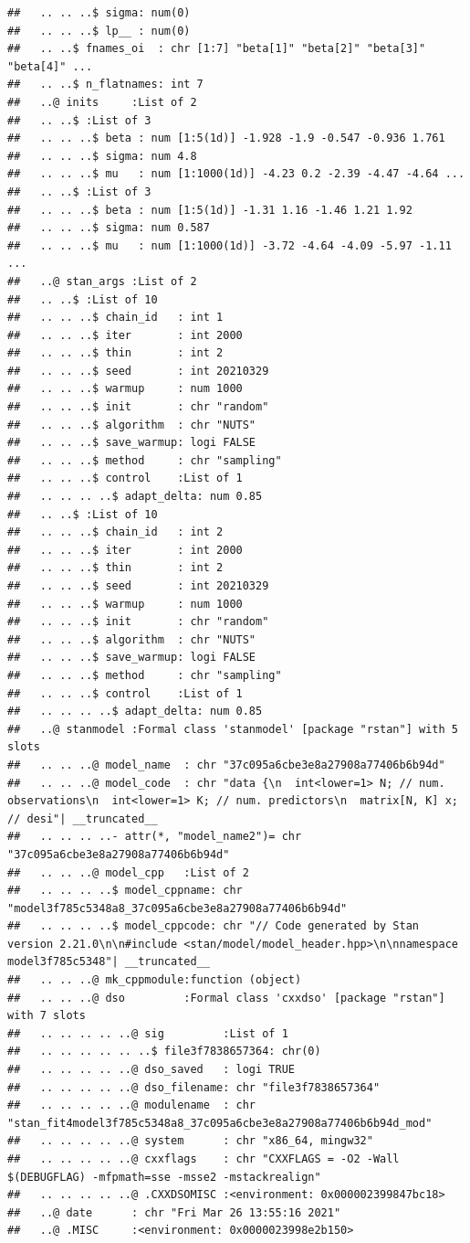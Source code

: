 \documentclass[
  11pt,
]{article}
\begin{document}
\begin{verbatim}
##   .. .. ..$ sigma: num(0) 
##   .. .. ..$ lp__ : num(0) 
##   .. ..$ fnames_oi  : chr [1:7] "beta[1]" "beta[2]" "beta[3]" "beta[4]" ...
##   .. ..$ n_flatnames: int 7
##   ..@ inits     :List of 2
##   .. ..$ :List of 3
##   .. .. ..$ beta : num [1:5(1d)] -1.928 -1.9 -0.547 -0.936 1.761
##   .. .. ..$ sigma: num 4.8
##   .. .. ..$ mu   : num [1:1000(1d)] -4.23 0.2 -2.39 -4.47 -4.64 ...
##   .. ..$ :List of 3
##   .. .. ..$ beta : num [1:5(1d)] -1.31 1.16 -1.46 1.21 1.92
##   .. .. ..$ sigma: num 0.587
##   .. .. ..$ mu   : num [1:1000(1d)] -3.72 -4.64 -4.09 -5.97 -1.11 ...
##   ..@ stan_args :List of 2
##   .. ..$ :List of 10
##   .. .. ..$ chain_id   : int 1
##   .. .. ..$ iter       : int 2000
##   .. .. ..$ thin       : int 2
##   .. .. ..$ seed       : int 20210329
##   .. .. ..$ warmup     : num 1000
##   .. .. ..$ init       : chr "random"
##   .. .. ..$ algorithm  : chr "NUTS"
##   .. .. ..$ save_warmup: logi FALSE
##   .. .. ..$ method     : chr "sampling"
##   .. .. ..$ control    :List of 1
##   .. .. .. ..$ adapt_delta: num 0.85
##   .. ..$ :List of 10
##   .. .. ..$ chain_id   : int 2
##   .. .. ..$ iter       : int 2000
##   .. .. ..$ thin       : int 2
##   .. .. ..$ seed       : int 20210329
##   .. .. ..$ warmup     : num 1000
##   .. .. ..$ init       : chr "random"
##   .. .. ..$ algorithm  : chr "NUTS"
##   .. .. ..$ save_warmup: logi FALSE
##   .. .. ..$ method     : chr "sampling"
##   .. .. ..$ control    :List of 1
##   .. .. .. ..$ adapt_delta: num 0.85
##   ..@ stanmodel :Formal class 'stanmodel' [package "rstan"] with 5 slots
##   .. .. ..@ model_name  : chr "37c095a6cbe3e8a27908a77406b6b94d"
##   .. .. ..@ model_code  : chr "data {\n  int<lower=1> N; // num. observations\n  int<lower=1> K; // num. predictors\n  matrix[N, K] x; // desi"| __truncated__
##   .. .. .. ..- attr(*, "model_name2")= chr "37c095a6cbe3e8a27908a77406b6b94d"
##   .. .. ..@ model_cpp   :List of 2
##   .. .. .. ..$ model_cppname: chr "model3f785c5348a8_37c095a6cbe3e8a27908a77406b6b94d"
##   .. .. .. ..$ model_cppcode: chr "// Code generated by Stan version 2.21.0\n\n#include <stan/model/model_header.hpp>\n\nnamespace model3f785c5348"| __truncated__
##   .. .. ..@ mk_cppmodule:function (object)  
##   .. .. ..@ dso         :Formal class 'cxxdso' [package "rstan"] with 7 slots
##   .. .. .. .. ..@ sig         :List of 1
##   .. .. .. .. .. ..$ file3f7838657364: chr(0) 
##   .. .. .. .. ..@ dso_saved   : logi TRUE
##   .. .. .. .. ..@ dso_filename: chr "file3f7838657364"
##   .. .. .. .. ..@ modulename  : chr "stan_fit4model3f785c5348a8_37c095a6cbe3e8a27908a77406b6b94d_mod"
##   .. .. .. .. ..@ system      : chr "x86_64, mingw32"
##   .. .. .. .. ..@ cxxflags    : chr "CXXFLAGS = -O2 -Wall $(DEBUGFLAG) -mfpmath=sse -msse2 -mstackrealign"
##   .. .. .. .. ..@ .CXXDSOMISC :<environment: 0x000002399847bc18> 
##   ..@ date      : chr "Fri Mar 26 13:55:16 2021"
##   ..@ .MISC     :<environment: 0x0000023998e2b150>
\end{verbatim}
\end{document}
